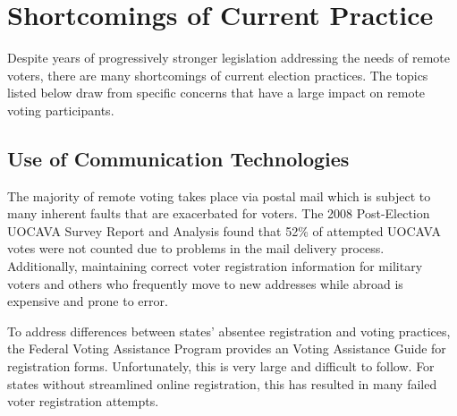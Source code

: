 \section{Shortcomings of Current Practice}

Despite years of progressively stronger legislation addressing the
needs of remote voters, there are many shortcomings of current
election practices. The topics listed below draw from specific
concerns that have a large impact on remote voting participants.

\subsection{Use of Communication Technologies}
The majority of remote voting takes place via postal mail which is
subject to many inherent faults that are exacerbated for voters. The
2008 Post-Election UOCAVA Survey Report and Analysis found that 52\%
of attempted UOCAVA votes were not counted due to problems in the mail
delivery process. Additionally, maintaining correct voter registration
information for military voters and others who frequently move to new
addresses while abroad is expensive and prone to error.



To address differences between states' absentee registration and
voting practices, the Federal Voting Assistance Program provides an
Voting Assistance Guide for registration forms. Unfortunately, this is
very large and difficult to follow. For states without streamlined
online registration, this has resulted in many failed voter
registration attempts.



